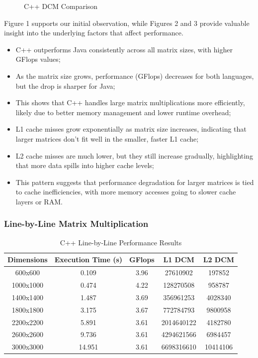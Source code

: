 \documentclass{article}
\begin{document}
\begin{figure}[H]
\begin{minipage}{0.32\textwidth}
        \caption{\small C++ DCM Comparison}
        \label{fig:cache_misses}
    \end{minipage}
\end{figure}

Figure 1 supports our initial observation, while Figures 2 and 3 provide valuable insight into the underlying factors that affect performance.

\begin{itemize}
    \item C++ outperforms Java consistently across all matrix sizes, with higher GFlops values;
    \item As the matrix size grows, performance (GFlops) decreases for both languages, but the drop is sharper for Java;
    \item This shows that C++ handles large matrix multiplications more efficiently, likely due to better memory management and lower runtime overhead;
    \item L1 cache misses grow exponentially as matrix size increases, indicating that larger matrices don't fit well in the smaller, faster L1 cache;
    \item L2 cache misses are much lower, but they still increase gradually, highlighting that more data spills into higher cache levels;
    \item This pattern suggests that performance degradation for larger matrices is tied to cache inefficiencies, with more memory accesses going to slower cache layers or RAM.
\end{itemize}

\subsubsection{Line-by-Line Matrix Multiplication}

\begin{table}[H]
\centering
\caption{C++ Line-by-Line Performance Results}
\begin{tabular}{||c | c | c | c | c||} 
 \hline
 \textbf{Dimensions} & \textbf{Execution Time (s)} & \textbf{GFlops} & \textbf{L1 DCM} & \textbf{L2 DCM} \\  
 \hline \hline
 600x600  & 0.109   & 3.96   & 27610902   & 197852    \\  
 \hline
 1000x1000 & 0.474   & 4.22   & 128270508 & 958787  \\  
 \hline
 1400x1400 & 1.487   & 3.69   & 356961253 & 4028340 \\  
 \hline
 1800x1800 & 3.175   & 3.67   & 772784793 & 9800958 \\  
 \hline
 2200x2200 & 5.891   & 3.61   & 2014640122 & 4182780 \\  
 \hline
 2600x2600 & 9.736   & 3.61   & 4294621566 & 6984457 \\  
 \hline
 3000x3000 & 14.951  & 3.61   & 6698316610 & 10414106 \\  
 \hline
\end{tabular}
\end{table}
\end{document}
